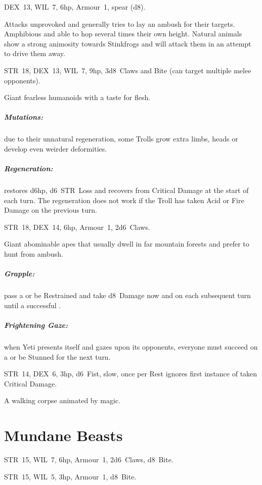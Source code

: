 \documentclass[itdr]{subfiles}
\begin{document}
\vfill

DEX~13, WIL~7, 6hp, Armour~1, spear (d8).

Attacks unprovoked and generally tries to lay an ambush for their targets. Amphibious and able to hop several times their own height. Natural animals show a strong animosity towards Stinkfrogs and will attack them in an attempt to drive them away.

\vfill

STR~18, DEX~13, WIL~7, 9hp, 3d8~Claws and Bite (can target multiple melee opponents).

Giant fearless humanoids with a taste for flesh.

\subparagraph{Mutations:} due to their unnatural regeneration, some Trolls grow extra limbs, heads or develop even weirder deformities.

\subparagraph{Regeneration:} restores d6hp, d6~STR~Loss and recovers from Critical Damage at the start of each turn. The regeneration does not work if the Troll has taken Acid or Fire Damage on the previous turn.

\vfill

STR~18, DEX~14, 6hp, Armour~1, 2d6~Claws.

Giant abominable apes that usually dwell in far mountain forests and prefer to hunt from ambush.

\subparagraph{Grapple:} pass a  or be Restrained and take d8~Damage now and on each subsequent turn until a successful .

\subparagraph{Frightening Gaze:} when Yeti presents itself and gazes upon its opponents, everyone must succeed on a  or be Stunned for the next turn.

\vfill

STR~14, DEX~6, 3hp, d6~Fist, slow, once per Rest \mbox{ignores} first instance of taken Critical Damage.

A walking corpse animated by magic.


\vfill
\break

\section{Mundane Beasts}

STR~15, WIL~7, 6hp, Armour~1, 2d6~Claws, d8~Bite.

\vfill

STR~15, WIL~5, 3hp, Armour~1, d8~Bite.
\end{document}
